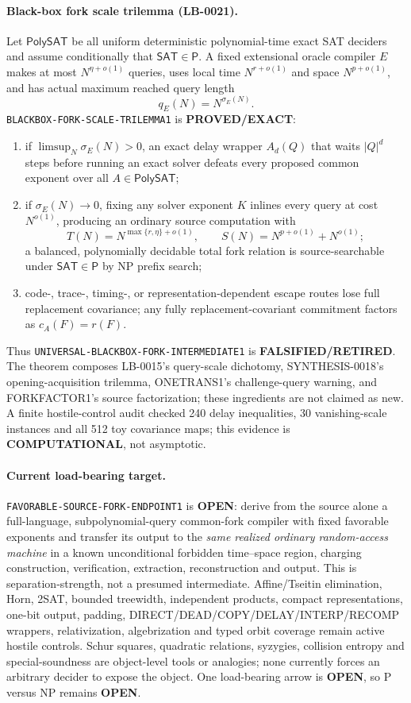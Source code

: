 \documentclass[11pt]{article}
\newcommand{\SAT}{\mathsf{SAT}}
\begin{document}
\paragraph{Black-box fork scale trilemma (LB-0021).}
Let \(\mathsf{PolySAT}\) be all uniform deterministic polynomial-time exact
SAT deciders and assume conditionally that \(\SAT\in\mathsf P\).  A fixed
extensional oracle compiler \(E\) makes at most \(N^{\eta+o(1)}\) queries,
uses local time \(N^{r+o(1)}\) and space \(N^{p+o(1)}\), and has actual
maximum reached query length
\[
 q_E(N)=N^{\sigma_E(N)}.
\]
\texttt{BLACKBOX-FORK-SCALE-TRILEMMA1} is \textbf{PROVED/EXACT}:
\begin{enumerate}
\item if \(\limsup_N\sigma_E(N)>0\), an exact delay wrapper
\(A_d(Q)\) that waits \(|Q|^d\) steps before running an exact solver defeats
every proposed common exponent over all \(A\in\mathsf{PolySAT}\);
\item if \(\sigma_E(N)\to0\), fixing any solver exponent \(K\) inlines every
query at cost \(N^{o(1)}\), producing an ordinary source computation with
\[
 T(N)=N^{\max\{r,\eta\}+o(1)},\qquad
 S(N)=N^{p+o(1)}+N^{o(1)};
\]
a balanced, polynomially decidable total fork relation is source-searchable
under \(\SAT\in\mathsf P\) by NP prefix search;
\item code-, trace-, timing-, or representation-dependent escape routes lose
full replacement covariance; any fully replacement-covariant commitment
factors as \(c_A(F)=r(F)\).
\end{enumerate}
Thus \texttt{UNIVERSAL-BLACKBOX-FORK-INTERMEDIATE1} is
\textbf{FALSIFIED/RETIRED}.  The theorem composes LB-0015's query-scale
dichotomy, SYNTHESIS-0018's opening-acquisition trilemma, ONETRANS1's
challenge-query warning, and FORKFACTOR1's source factorization; these
ingredients are not claimed as new.  A finite hostile-control audit checked
240 delay inequalities, 30 vanishing-scale instances and all 512 toy
covariance maps; this evidence is \textbf{COMPUTATIONAL}, not asymptotic.

\paragraph{Current load-bearing target.}
\texttt{FAVORABLE-SOURCE-FORK-ENDPOINT1} is \textbf{OPEN}: derive from the
source alone a full-language, subpolynomial-query common-fork compiler with
fixed favorable exponents and transfer its output to the \emph{same realized
ordinary random-access machine} in a known unconditional forbidden
time--space region, charging construction, verification, extraction,
reconstruction and output.  This is separation-strength, not a presumed
intermediate.  Affine/Tseitin elimination, Horn, 2SAT, bounded treewidth,
independent products, compact representations, one-bit output, padding,
DIRECT/DEAD/COPY/DELAY/INTERP/RECOMP wrappers, relativization,
algebrization and typed orbit coverage remain active hostile controls.
Schur squares, quadratic relations, syzygies, collision entropy and
special-soundness are object-level tools or analogies; none currently forces
an arbitrary decider to expose the object.  One load-bearing arrow is
\textbf{OPEN}, so P versus NP remains \textbf{OPEN}.
\end{document}
